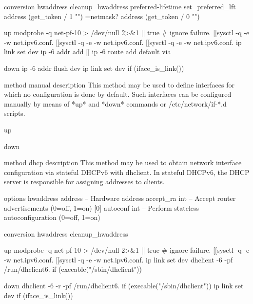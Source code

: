\documentclass{article}
\begin{document}
  conversion
    hwaddress cleanup_hwaddress
    preferred-lifetime set_preferred_lft
    address (get_token / 1 "") =netmask?
    address (get_token / 0 "")

  up
    modprobe -q net-pf-10 > /dev/null 2>&1 || true # ignore failure.
    [[sysctl -q -e -w net.ipv6.conf.%
    [[sysctl -q -e -w net.ipv6.conf.%
    [[sysctl -q -e -w net.ipv6.conf.%
    ip link set dev %
    ip -6 addr add %
    [[ ip -6 route add default via %

  down
    ip -6 addr flush dev %
    ip link set dev %
		if (iface_is_link())

method manual
  description
    This method may be used to define interfaces for which no configuration
    is done by default.  Such interfaces can be configured manually by
    means of *up* and *down* commands or /etc/network/if-*.d scripts.

  up

  down

method dhcp
  description
    This method may be used to obtain network interface configuration via
    stateful DHCPv6 with dhclient.  In stateful DHCPv6, the DHCP server is
    responsible for assigning addresses to clients.

  options
    hwaddress address      -- Hardware address
    accept_ra int          -- Accept router advertisements (0=off, 1=on) [0]
    autoconf int           -- Perform stateless autoconfiguration (0=off, 1=on)

  conversion
    hwaddress cleanup_hwaddress

  up
    modprobe -q net-pf-10 > /dev/null 2>&1 || true # ignore failure.
    [[sysctl -q -e -w net.ipv6.conf.%
    [[sysctl -q -e -w net.ipv6.conf.%
    ip link set dev %
    dhclient -6 -pf /run/dhclient6.%
        if (execable("/sbin/dhclient"))

  down
    dhclient -6 -r -pf /run/dhclient6.%
        if (execable("/sbin/dhclient"))
    ip link set dev %
		if (iface_is_link())
\end{document}
